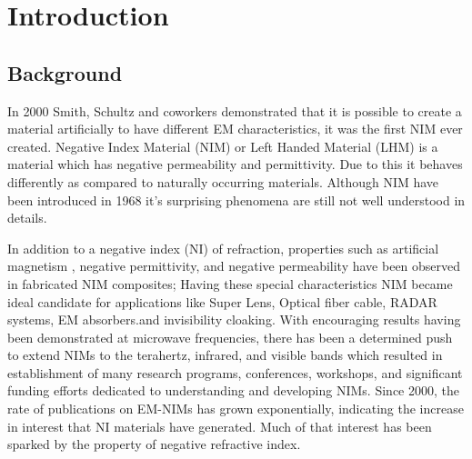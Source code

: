 
\chapter{Introduction} %

\label{Chapter1} %

\fancyhead[RO]{\thepage}
\fancyhead[RE]{\thepage}
\fancyhead[LO]{\emph{\ttitle}}


\section{Background }
In 2000 Smith, Schultz and coworkers \cite{smith} demonstrated that it is possible to create a material artificially to have different EM  characteristics, it was the first NIM ever created. Negative Index Material (NIM) or Left Handed Material (LHM) is a material which has negative permeability and permittivity. Due to this it behaves differently as compared to naturally occurring materials. Although NIM have been introduced in 1968 \cite{vesel}
it's surprising phenomena are still not well understood in details.

 In addition
to a negative index (NI) of refraction, properties such as artificial
magnetism \cite{pendry}
, negative permittivity, and negative permeability have
been observed in fabricated NIM composites; 
Having these special characteristics NIM became ideal candidate 
for applications like Super Lens, Optical fiber cable, RADAR systems, EM absorbers.and invisibility cloaking. With
encouraging results having been demonstrated at microwave
frequencies, there has been a determined push to extend NIMs to
the terahertz, infrared, and visible bands which resulted in establishment of many
research programs, conferences, workshops, and significant
funding efforts dedicated to understanding and developing NIMs.
Since 2000, the rate of publications on EM-NIMs has grown
exponentially, \cite{rama}
indicating the increase in interest that NI
materials have generated. Much of that interest has been sparked by
the property of negative refractive index.

